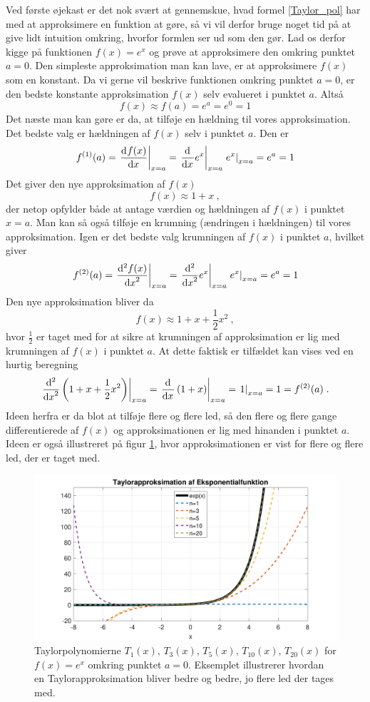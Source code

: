\noindent
Ved første øjekast er det nok svært at gennemskue, hvad formel \eqref{Taylor_pol} har med at approksimere en funktion at gøre, så vi vil derfor bruge noget tid på at give lidt intuition omkring, hvorfor formlen ser ud som den gør. Lad os derfor kigge på funktionen $f(x) = e^x$ og prøve at approksimere den omkring punktet $a = 0$. Den simpleste approksimation man kan lave, er at approksimere $f(x)$ som en konstant. Da vi gerne vil beskrive funktionen omkring punktet $a=0$, er den bedste konstante approksimation $f(x)$ selv evalueret i punktet $a$. Altså
$$f(x) \approx f(a) = e^a = e^0 = 1$$
Det næste man kan gøre er da, at tilføje en hældning til vores approksimation. Det bedste valg er hældningen af $f(x)$ selv i punktet $a$. Den er
$$f^{(1)}(a) = \left. \dif{x}{f(x)} \right|_{x=a} = \left. \dif{x}{} e^x \right|_{x=a} \left. e^x \right|_{x=a} = e^a = 1$$
Det giver den nye approksimation af $f(x)$
$$f(x) \approx 1 + x \ ,$$
der netop opfylder både at antage værdien og hældningen af $f(x)$ i punktet $x=a$. Man kan så også tilføje en krumning (ændringen i hældningen) til vores approksimation. Igen er det bedste valg krumningen af $f(x)$ i punktet $a$, hvilket giver
$$f^{(2)}(a) = \left. \dif[2]{x}{f(x)} \right|_{x=a} = \left. \dif[2]{x}{} e^x \right|_{x=a} \left. e^x \right|_{x=a} = e^a = 1$$
Den nye approksimation bliver da
$$f(x) \approx 1 +  x + \frac{1}{2} x^2 \ ,$$
hvor $\tfrac{1}{2}$ er taget med for at sikre at krumningen af approksimation er lig med krumningen af $f(x)$ i punktet $a$. At dette faktisk er tilfældet kan vises ved en hurtig beregning
\begin{equation*}
\left. \dif[2]{x}{} \left(1+x+\frac{1}{2}x^2\right) \right|_{x=a} = \left. \dif{x}{} \left(1+x\right) \right|_{x=a} = \left. 1 \right|_{x=a} = 1 = f^{(2)}(a) \; .
\end{equation*}
Ideen herfra er da blot at tilføje flere og flere led, så den flere og flere gange differentierede af $f(x)$ og approksimationen er lig med hinanden i punktet $a$. Ideen er også illustreret på figur \ref{Taylorseries_figure}, hvor approksimationen er vist for flere og flere led, der er taget med.
\begin{figure}[h!]
	\centering
	\includegraphics[scale=0.65]{matematik/Taylorseries_figure.pdf}
	\caption{Taylorpolynomierne $T_1(x), \, T_3(x), \, T_5(x), \,T_{10}(x), \, T_{20}(x)$ for $f(x) = e^x$ omkring punktet $a=0$. Eksemplet illustrerer hvordan en Taylorapproksimation bliver bedre og bedre, jo flere led der tages med.}
	\label{Taylorseries_figure}
\end{figure}
